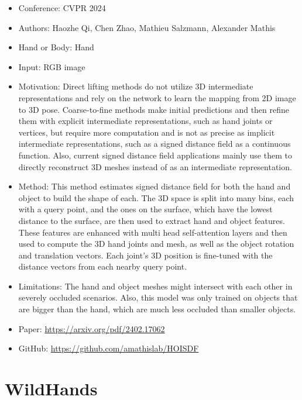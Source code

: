 \documentclass{article}
\begin{document}
\begin{itemize}
    \item Conference: CVPR 2024
    \item Authors: Haozhe Qi, Chen Zhao, Mathieu Salzmann, Alexander Mathis
    \item Hand or Body: Hand
    \item Input: RGB image
    \item Motivation: Direct lifting methods do not utilize 3D intermediate representations and rely on the network to learn the mapping from 2D image to 3D pose. Coarse-to-fine methods make initial predictions and then refine them with explicit intermediate representations, such as hand joints or vertices, but require more computation and is not as precise as implicit intermediate representations, such as a signed distance field as a continuous function. Also, current signed distance field applications mainly use them to directly reconstruct 3D meshes instead of as an intermediate representation.
    \item Method: This method estimates signed distance field for both the hand and object to build the shape of each. The 3D space is split into many bins, each with a query point, and the ones on the surface, which have the lowest distance to the surface, are then used to extract hand and object features. These features are enhanced with multi head self-attention layers and then used to compute the 3D hand joints and mesh, as well as the object rotation and translation vectors. Each joint's 3D position is fine-tuned with the distance vectors from each nearby query point.
    \item Limitations: The hand and object meshes might intersect with each other in severely occluded scenarios. Also, this model was only trained on objects that are bigger than the hand, which are much less occluded than smaller objects.
    \item Paper: \url{https://arxiv.org/pdf/2402.17062}
    \item GitHub: \url{https://github.com/amathislab/HOISDF}
\end{itemize}

\section*{WildHands}
\end{document}
